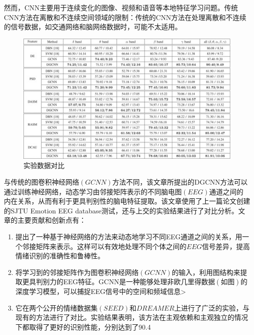 \documentclass[conference]{IEEEtran}
\begin{document}
然而，CNN主要用于连续变化的图像、视频和语音等本地特征学习问题。传统CNN方法在离散和不连续空间领域的限制：传统的CNN方法在处理离散和不连续的信号数据，如交通网络和脑网络数据时，可能不太适用。
\begin{figure}
    \centering
    \includegraphics*[scale=0.6]{images/table.jpg}
    \caption[short]{实验数据对比}
\end{figure}
与传统的图卷积神经网络$(GCNN)$方法不同，该文章所提出的DGCNN方法可以通过训练神经网络，动态学习由邻接矩阵表示的不同脑电图$(EEG)$通道之间的内在关系，从而有利于更具判别性的脑电特征提取。该文章使用了上一篇论文创建的SJTU Emotion EEG database测试，还与上交的实验结果进行了对比分析。文章的主要贡献和创新点有：
\begin{enumerate}
    \item 提出了一种基于神经网络的方法来动态地学习不同EEG通道之间的关系，用一个邻接矩阵来表示。这样可以有效地处理不同个体之间的$EEG$信号差异，提高情绪识别的准确性和鲁棒性。
    \item 将学习到的邻接矩阵作为图卷积神经网络$(GCNN)$的输入，利用图结构来提取更具判别力的EEG特征。GCNN是一种能够处理非欧几里得数据$(如图)$的深度学习模型，可以捕捉EEG信号中的空间和频域信息>
    \item 它在两个公开的情绪数据集$(SEED)$和$DREAMER$上进行了广泛的实验，与现有的方法进行了对比。实验结果表明，该方法在主观依赖和主观独立的情况下都取得了更好的识别性能，分别达到了90.4%
\end{enumerate}



\end{document}

